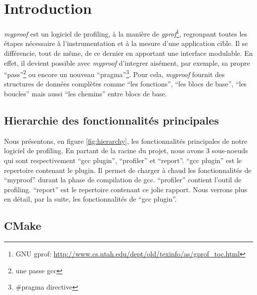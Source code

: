 %

\section{Introduction}

\emph{myproof} est un logiciel de profiling, à la manière de \emph{gprof}\footnote{GNU gprof: \url{http://www.cs.utah.edu/dept/old/texinfo/as/gprof_toc.html}}, regroupant toutes les étapes nécessaire à l'instrumentation et à la mesure d'une application cible. Il se différencie, tout de même, de ce dernier en apportant une interface modulable. En effet, il devient possible avec \emph{myproof} d'integrer aisément, par exemple, sa propre ``pass''\footnote{une passe gcc} ou encore un nouveau ``pragma''\footnote{\#pragma directive}. Pour cela, \emph{myproof} fournit des structures de données complètes comme ``les fonctions'', ``les blocs de base'', ``les boucles'' mais aussi ``les chemins'' entre blocs de base.

\subsection{Hierarchie des fonctionnalités principales}

Nous présentons, en figure \ref{fig:hierarchy}, les fonctionnalités principales de notre logiciel de profiling. En partant de la racine du projet, nous avons 3 sous-noeuds qui sont respectivement ``gcc plugin'', ``profiler'' et ``report''. ``gcc plugin'' est le repertoire contenant le plugin. Il permet de charger à chaud les fonctionnalités de ``myproof'' durant la phase de compilation de gcc. ``profiler'' contient l'outil de profiling. ``report'' est le repertoire contenant ce jolie rapport. Nous verrons plus en détail, par la suite, les fonctionnalités de ``gcc plugin''.

\subsection{CMake}

